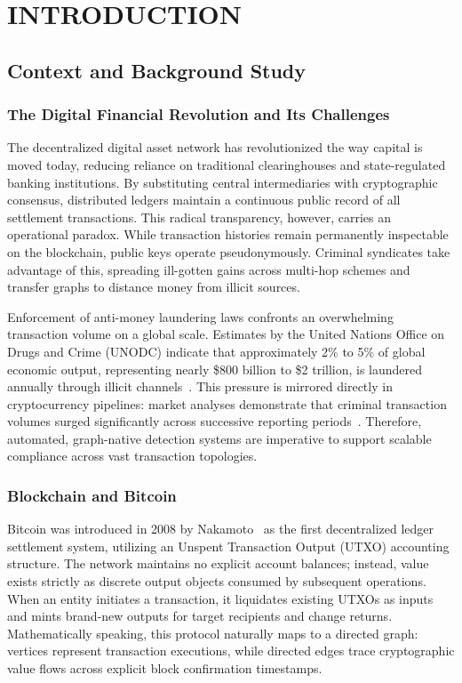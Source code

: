 \chapter{INTRODUCTION}
\label{ChapterIntroduction}

\section{Context and Background Study}
\label{sec:intro_background}

\subsection{The Digital Financial Revolution and Its Challenges}

The decentralized digital asset network has revolutionized the way capital is moved today, reducing reliance on traditional clearinghouses and state-regulated banking institutions. By substituting central intermediaries with cryptographic consensus, distributed ledgers maintain a continuous public record of all settlement transactions. This radical transparency, however, carries an operational paradox. While transaction histories remain permanently inspectable on the blockchain, public keys operate pseudonymously. Criminal syndicates take advantage of this, spreading ill-gotten gains across multi-hop schemes and transfer graphs to distance money from illicit sources.

Enforcement of anti-money laundering laws confronts an overwhelming transaction volume on a global scale. Estimates by the United Nations Office on Drugs and Crime (UNODC) indicate that approximately 2\% to 5\% of global economic output, representing nearly \$800 billion to \$2 trillion, is laundered annually through illicit channels~\cite{unodc2023}. This pressure is mirrored directly in cryptocurrency pipelines: market analyses demonstrate that criminal transaction volumes surged significantly across successive reporting periods~\cite{chainalysis2023}. Therefore, automated, graph-native detection systems are imperative to support scalable compliance across vast transaction topologies.

\subsection{Blockchain and Bitcoin}

Bitcoin was introduced in 2008 by Nakamoto~\cite{nakamoto2008bitcoin} as the first decentralized ledger settlement system, utilizing an Unspent Transaction Output (UTXO) accounting structure. The network maintains no explicit account balances; instead, value exists strictly as discrete output objects consumed by subsequent operations. When an entity initiates a transaction, it liquidates existing UTXOs as inputs and mints brand-new outputs for target recipients and change returns. Mathematically speaking, this protocol naturally maps to a directed graph: vertices represent transaction executions, while directed edges trace cryptographic value flows across explicit block confirmation timestamps.

